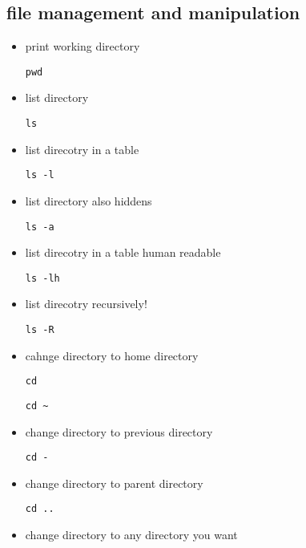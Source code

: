 \documentclass[
]{article}
\begin{document}
\hypertarget{file-management-and-manipulation}{%
\subsection{file management and
manipulation}\label{file-management-and-manipulation}}

\begin{itemize}
\item
  print working directory

\begin{verbatim}
pwd
\end{verbatim}
\item
  list directory

\begin{verbatim}
ls
\end{verbatim}
\item
  list direcotry in a table

\begin{verbatim}
ls -l
\end{verbatim}
\item
  list directory also hiddens

\begin{verbatim}
ls -a
\end{verbatim}
\item
  list direcotry in a table human readable

\begin{verbatim}
ls -lh
\end{verbatim}
\item
  list direcotry recursively!

\begin{verbatim}
ls -R
\end{verbatim}
\item
  cahnge directory to home directory

\begin{verbatim}
cd
\end{verbatim}

\begin{verbatim}
cd ~
\end{verbatim}
\item
  change directory to previous directory

\begin{verbatim}
cd -
\end{verbatim}
\item
  change directory to parent directory

\begin{verbatim}
cd ..
\end{verbatim}
\item
  change directory to any directory you want


\end{itemize}
\end{document}
